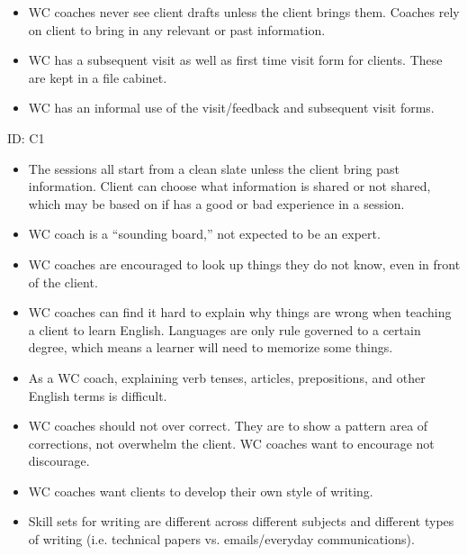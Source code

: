 \documentclass[12pt]{article} %
\begin{document}
\begin{itemize}
    \item WC coaches never see client drafts unless the client brings them.  Coaches rely on client to bring in any relevant or past information.
     
    \item WC has a subsequent visit as well as first time visit form for clients.  These are kept in a file cabinet.
     
    \item WC has an informal use of the visit/feedback and subsequent visit forms.
  
  \end{itemize}
  
  ID: C1
  
  \begin{itemize}
    
    \item The sessions all start from a clean slate unless the client bring past information.  Client can choose what information is shared or not shared, which may be based on if has a good or bad experience in a session.
     
    \item WC coach is a “sounding board,” not expected to be an expert.
     
    \item WC coaches are encouraged to look up things they do not know, even in front of the client.
     
    \item WC coaches can find it hard to explain why things are wrong when teaching a client to learn English.  Languages are only rule governed to a certain degree, which means a learner will need to memorize some things.
     
    \item As a WC coach, explaining verb tenses, articles, prepositions, and other English terms is difficult.
     
    \item WC coaches should not over correct.  They are to show a pattern area of corrections, not overwhelm the client.  WC coaches want to encourage not discourage.
     
    \item WC coaches want clients to develop their own style of writing.
     
    \item Skill sets for writing are different across different subjects and different types of writing (i.e. technical papers vs. emails/everyday communications).
     

\end{itemize}
\end{document}
